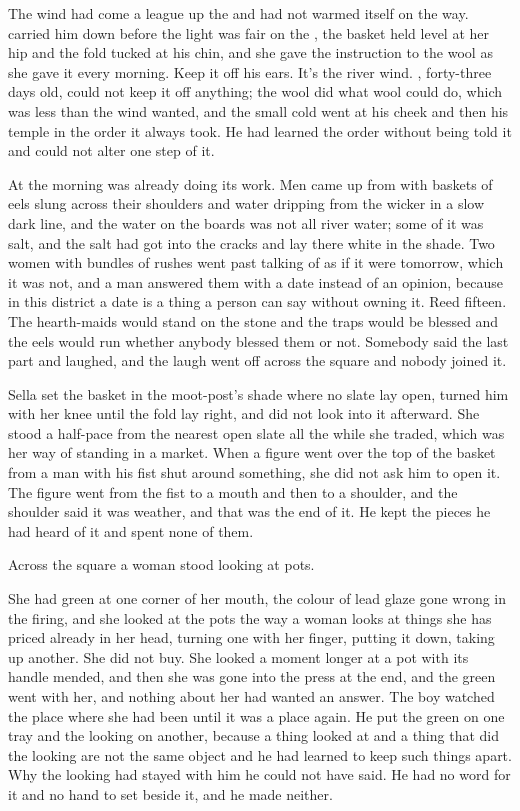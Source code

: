 
The wind had come a league up the  and had not warmed itself on the way.  carried him down before the light was fair on the , the basket held level at her hip and the fold tucked at his chin, and she gave the instruction to the wool as she gave it every morning. Keep it off his ears. It's the river wind. , forty-three days old, could not keep it off anything; the wool did what wool could do, which was less than the wind wanted, and the small cold went at his cheek and then his temple in the order it always took. He had learned the order without being told it and could not alter one step of it.

At  the morning was already doing its work. Men came up from  with baskets of eels slung across their shoulders and water dripping from the wicker in a slow dark line, and the water on the boards was not all river water; some of it was salt, and the salt had got into the cracks and lay there white in the shade. Two women with bundles of rushes went past talking of  as if it were tomorrow, which it was not, and a man answered them with a date instead of an opinion, because in this district a date is a thing a person can say without owning it. Reed fifteen. The hearth-maids would stand on the stone and the traps would be blessed and the eels would run whether anybody blessed them or not. Somebody said the last part and laughed, and the laugh went off across the square and nobody joined it.

Sella set the basket in the moot-post's shade where no slate lay open, turned him with her knee until the fold lay right, and did not look into it afterward. She stood a half-pace from the nearest open slate all the while she traded, which was her way of standing in a market. When a figure went over the top of the basket from a man with his fist shut around something, she did not ask him to open it. The figure went from the fist to a mouth and then to a shoulder, and the shoulder said it was weather, and that was the end of it. He kept the pieces he had heard of it and spent none of them.

Across the square a woman stood looking at pots.

She had green at one corner of her mouth, the colour of lead glaze gone wrong in the firing, and she looked at the pots the way a woman looks at things she has priced already in her head, turning one with her finger, putting it down, taking up another. She did not buy. She looked a moment longer at a pot with its handle mended, and then she was gone into the press at the  end, and the green went with her, and nothing about her had wanted an answer. The boy watched the place where she had been until it was a place again. He put the green on one tray and the looking on another, because a thing looked at and a thing that did the looking are not the same object and he had learned to keep such things apart. Why the looking had stayed with him he could not have said. He had no word for it and no hand to set beside it, and he made neither.

